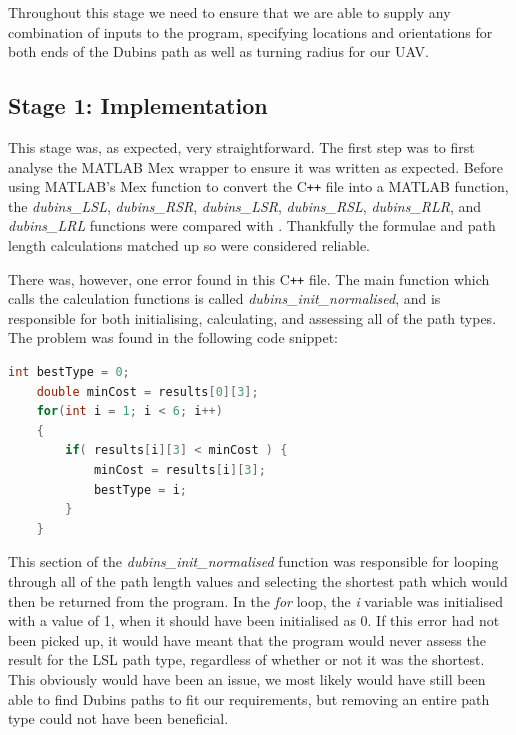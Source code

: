 Throughout this stage we need to ensure that we are able to supply any combination of inputs to the program, specifying locations and orientations for both ends of the Dubins path as well as turning radius for our UAV.

\subsection{Stage 1: Implementation}
\label{task1:stage1:implementation}


This stage was, as expected, very straightforward. The first step was to first analyse the MATLAB Mex wrapper to ensure it was written as expected. Before using MATLAB's Mex function to convert the C\texttt{++} file into a MATLAB function, the \textit{dubins\_LSL}, \textit{dubins\_RSR}, \textit{dubins\_LSR}, \textit{dubins\_RSL}, \textit{dubins\_RLR}, and \textit{dubins\_LRL} functions were compared with \cite{shkel2001classification}. Thankfully the formulae and path length calculations matched up so were considered reliable. 

There was, however, one error found in this C\texttt{++} file. The main function which calls the calculation functions is called \textit{dubins\_init\_normalised}, and is responsible for both initialising, calculating, and assessing all of the path types. The problem was found in the following code snippet: 

\begin{minipage}{\linewidth}
\begin{lstlisting}[language=C++]
    int bestType = 0;
    double minCost = results[0][3];
    for(int i = 1; i < 6; i++) 
    {
        if( results[i][3] < minCost ) {
            minCost = results[i][3];
            bestType = i;
        } 
    }
\end{lstlisting}
\end{minipage}

This section of the \textit{dubins\_init\_normalised} function was responsible for looping through all of the path length values and selecting the shortest path which would then be returned from the program. In the \textit{for} loop, the \textit{i} variable was initialised with a value of 1, when it should have been initialised as 0. If this error had not been picked up, it would have meant that the program would never assess the result for the LSL path type, regardless of whether or not it was the shortest. This obviously would have been an issue, we most likely would have still been able to find Dubins paths to fit our requirements, but removing an entire path type could not have been beneficial. 

